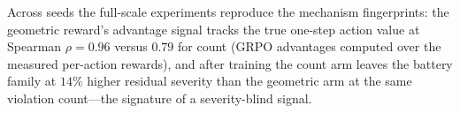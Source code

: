 Across seeds the full-scale experiments reproduce the mechanism fingerprints: the geometric reward's advantage signal tracks the true one-step action value at Spearman $\rho{=}0.96$ versus $0.79$ for count (GRPO advantages computed over the measured per-action rewards), and after training the count arm leaves the battery family at $14\%$ higher residual severity than the geometric arm at the same violation count---the signature of a severity-blind signal.
